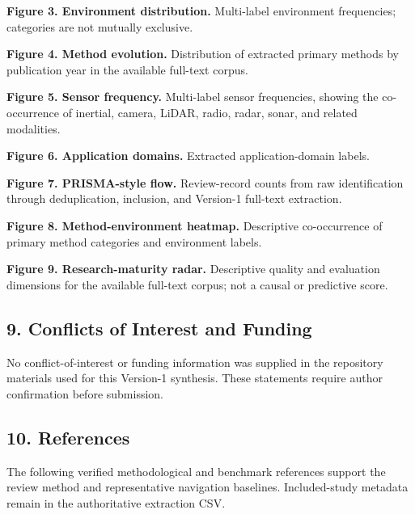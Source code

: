 \documentclass[
  journal]{IEEEtran}
\begin{document}
\textbf{Figure 3. Environment distribution.} Multi-label environment
frequencies; categories are not mutually exclusive.

\textbf{Figure 4. Method evolution.} Distribution of extracted primary
methods by publication year in the available full-text corpus.

\textbf{Figure 5. Sensor frequency.} Multi-label sensor frequencies,
showing the co-occurrence of inertial, camera, LiDAR, radio, radar,
sonar, and related modalities.

\textbf{Figure 6. Application domains.} Extracted application-domain
labels.

\textbf{Figure 7. PRISMA-style flow.} Review-record counts from raw
identification through deduplication, inclusion, and Version-1 full-text
extraction.

\textbf{Figure 8. Method-environment heatmap.} Descriptive co-occurrence
of primary method categories and environment labels.

\textbf{Figure 9. Research-maturity radar.} Descriptive quality and
evaluation dimensions for the available full-text corpus; not a causal
or predictive score.

\subsection{9. Conflicts of Interest and
Funding}\label{9-conflicts-of-interest-and-funding}

No conflict-of-interest or funding information was supplied in the
repository materials used for this Version-1 synthesis. These statements
require author confirmation before submission.

\subsection{10. References}\label{10-references}

The following verified methodological and benchmark references support
the review method and representative navigation baselines.
Included-study metadata remain in the authoritative extraction CSV.
\end{document}
